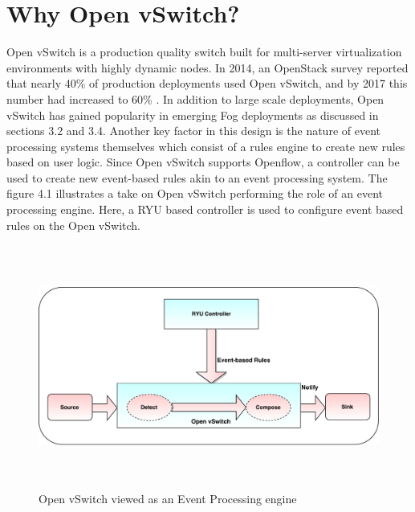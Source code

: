 \section{Why Open vSwitch?}
Open vSwitch is a production quality switch built for multi-server virtualization environments with highly dynamic nodes. In 2014, an OpenStack survey \cite{OpenStack14} reported that nearly 40\% of production deployments used Open vSwitch, and by 2017 this number had increased to 60\% \cite{OpenStack17}. In addition to large scale deployments, Open vSwitch has gained popularity in emerging Fog deployments as discussed in sections 3.2 and 3.4. Another key factor in this design is the nature of event processing systems themselves which consist of a rules engine to create new rules based on user logic. Since Open vSwitch supports Openflow, a controller can be used to create new event-based rules akin to an event processing system. The figure 4.1 illustrates a take on Open vSwitch performing the role of an event processing engine. Here, a RYU based controller is used to configure event based rules on the Open vSwitch. 
 \begin{figure}[H]
	\centering
	\caption{Open vSwitch viewed as an Event Processing engine} 
	\includegraphics[height=8cm,width=14cm]{evsep01.pdf}
\end{figure}

